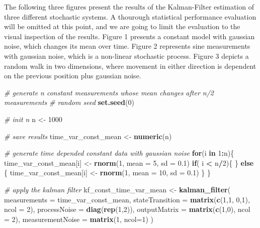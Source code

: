 \documentclass[
]{article}
\newenvironment{Shaded}{\begin{snugshade}}{\end{snugshade}}
\newcommand{\CommentTok}[1]{\textcolor[rgb]{0.56,0.35,0.01}{\textit{#1}}}
\newcommand{\ControlFlowTok}[1]{\textcolor[rgb]{0.13,0.29,0.53}{\textbf{#1}}}
\newcommand{\DataTypeTok}[1]{\textcolor[rgb]{0.13,0.29,0.53}{#1}}
\newcommand{\DecValTok}[1]{\textcolor[rgb]{0.00,0.00,0.81}{#1}}
\newcommand{\FloatTok}[1]{\textcolor[rgb]{0.00,0.00,0.81}{#1}}
\newcommand{\KeywordTok}[1]{\textcolor[rgb]{0.13,0.29,0.53}{\textbf{#1}}}
\newcommand{\NormalTok}[1]{#1}
\newcommand{\OperatorTok}[1]{\textcolor[rgb]{0.81,0.36,0.00}{\textbf{#1}}}
\newcommand{\StringTok}[1]{\textcolor[rgb]{0.31,0.60,0.02}{#1}}
\begin{document}
The following three figures present the results of the Kalman-Filter
estimation of three different stochastic systems. A thourough
statistical performance evaluation will be omitted at this point, and we
are going to limit the evaluation to the visual inspection of the
results. Figure 1 presents a constant model with gaussian noise, which
changes its mean over time. Figure 2 represents sine measurements with
gaussian noise, which is a non-linear stochastic process. Figure 3
depicts a random walk in two dimensions, where movement in either
direction is dependent on the previous position plus gaussian noise.

\begin{Shaded}
\begin{Highlighting}[]
\CommentTok{# generate n constant measurements whose mean changes after n/2 measurements}
\CommentTok{# random seed}
\KeywordTok{set.seed}\NormalTok{(}\DecValTok{0}\NormalTok{)}

\CommentTok{# init n}
\NormalTok{n <-}\StringTok{ }\DecValTok{1000}

\CommentTok{# save results}
\NormalTok{time_var_const_mean <-}\StringTok{ }\KeywordTok{numeric}\NormalTok{(n)}

\CommentTok{# generate time depended constant data with gaussian noise}
\ControlFlowTok{for}\NormalTok{(i }\ControlFlowTok{in} \DecValTok{1}\OperatorTok{:}\NormalTok{n)\{}
\NormalTok{        time_var_const_mean[i] <-}\StringTok{ }\KeywordTok{rnorm}\NormalTok{(}\DecValTok{1}\NormalTok{, }\DataTypeTok{mean =} \DecValTok{5}\NormalTok{, }\DataTypeTok{sd =} \FloatTok{0.1}\NormalTok{)}
    \ControlFlowTok{if}\NormalTok{( i }\OperatorTok{<}\StringTok{ }\NormalTok{n}\OperatorTok{/}\DecValTok{2}\NormalTok{)\{}
\NormalTok{    \} }\ControlFlowTok{else}\NormalTok{ \{}
\NormalTok{        time_var_const_mean[i] <-}\StringTok{ }\KeywordTok{rnorm}\NormalTok{(}\DecValTok{1}\NormalTok{, }\DataTypeTok{mean =} \DecValTok{10}\NormalTok{, }\DataTypeTok{sd =} \FloatTok{0.1}\NormalTok{)}
\NormalTok{    \}}
\NormalTok{\}}

\CommentTok{# apply the kalman filter}
\NormalTok{kf_const_time_var_mean <-}\StringTok{ }\KeywordTok{kalman_filter}\NormalTok{( }\DataTypeTok{measurements =}\NormalTok{ time_var_const_mean, }\DataTypeTok{stateTransition =} \KeywordTok{matrix}\NormalTok{(}\KeywordTok{c}\NormalTok{(}\DecValTok{1}\NormalTok{,}\DecValTok{1}\NormalTok{, }\DecValTok{0}\NormalTok{,}\DecValTok{1}\NormalTok{), }\DataTypeTok{ncol =} \DecValTok{2}\NormalTok{), }
    \DataTypeTok{processNoise =} \KeywordTok{diag}\NormalTok{(}\KeywordTok{rep}\NormalTok{(}\DecValTok{1}\NormalTok{,}\DecValTok{2}\NormalTok{)), }\DataTypeTok{outputMatrix =} \KeywordTok{matrix}\NormalTok{(}\KeywordTok{c}\NormalTok{(}\DecValTok{1}\NormalTok{,}\DecValTok{0}\NormalTok{), }\DataTypeTok{ncol =} \DecValTok{2}\NormalTok{),  }\DataTypeTok{measurementNoise =} \KeywordTok{matrix}\NormalTok{(}\DecValTok{1}\NormalTok{, }\DataTypeTok{ncol=}\DecValTok{1}\NormalTok{)}
\NormalTok{)}


\end{Highlighting}
\end{Shaded}
\end{document}
